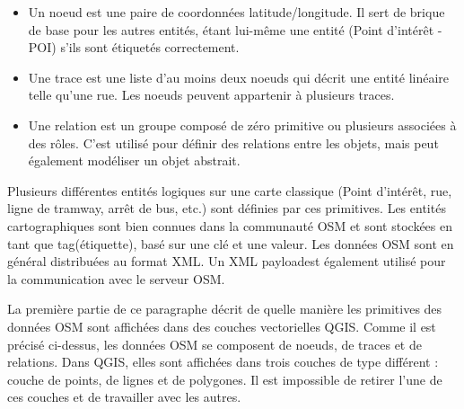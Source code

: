 \begin{itemize}[label=--]
\item Un noeud est une paire de coordonnées latitude/longitude. Il sert de brique de base pour les autres entités, étant lui-même une entité (Point d'intérêt - POI) s'ils sont étiquetés correctement.
\item Une trace est une liste d'au moins deux noeuds qui décrit une entité linéaire telle qu'une rue. Les noeuds peuvent appartenir à plusieurs traces.
\item Une relation est un groupe composé de zéro primitive ou plusieurs associées à des rôles. C'est utilisé pour définir des relations entre les objets, mais peut également modéliser un objet abstrait.
\end{itemize}

Plusieurs différentes entités logiques sur une carte classique (Point d'intérêt, rue, ligne de tramway, arrêt de bus, etc.) sont définies par ces primitives. Les entités cartographiques sont bien connues dans la communauté OSM et sont stockées en tant que \og tag\fg (étiquette), basé sur une clé et une valeur. Les données OSM sont en général distribuées au format XML. Un \og XML payload\fg est également utilisé pour la communication avec le serveur OSM.

\label{qgis-osm-connection}

La première partie de ce paragraphe décrit de quelle manière les primitives des données OSM sont affichées dans des couches vectorielles QGIS. Comme il est précisé ci-dessus, les données OSM se composent de noeuds, de traces et de relations. Dans QGIS, elles sont affichées dans trois couches de type différent : couche de points, de lignes et de polygones. Il est impossible de retirer l'une de ces couches et de travailler avec les autres.


